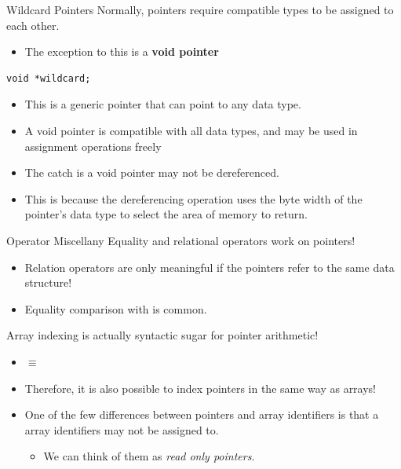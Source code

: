 \documentclass[11pt]{beamer}
\let\OldTexttt\texttt
\renewcommand{\texttt}[1]{\OldTexttt{\color{teal}{#1}}}
\begin{document}
\begin{frame}[fragile=singleslide]{Wildcard Pointers}
Normally, pointers require compatible types to be assigned to each other.
\begin{itemize}
\item The exception to this is a \textbf{void pointer}
\end{itemize}
\begin{lstlisting}[style=C]
void *wildcard;
\end{lstlisting}
\begin{itemize}
\item This is a generic pointer that can point to any data type.
\item A void pointer is compatible with all data types, and may be used in assignment operations freely
\item The catch is a void pointer may not be dereferenced.  
\item This is because the dereferencing operation uses the byte width of the pointer's data type to select the area of memory to return. 
\end{itemize}
\end{frame}

\begin{frame}{Operator Miscellany}
Equality and relational operators work on pointers! 
\begin{itemize}
\item Relation operators are only meaningful if the pointers refer to the same data structure! 
\item Equality comparison with \texttt{NULL} is common.
\end{itemize}
Array indexing is actually syntactic sugar for pointer arithmetic! 
\begin{itemize}
\item \texttt{foo[3]} $\equiv$ \texttt{*(foo + 3)}
\item Therefore, it is also possible to index pointers in the same way as arrays! 
\item One of the few differences between pointers and array identifiers is that a array identifiers may not be assigned to.  
\begin{itemize}
\item We can think of them as \emph{read only pointers}.
\end{itemize}
\end{itemize}
\end{frame}
\end{document}
